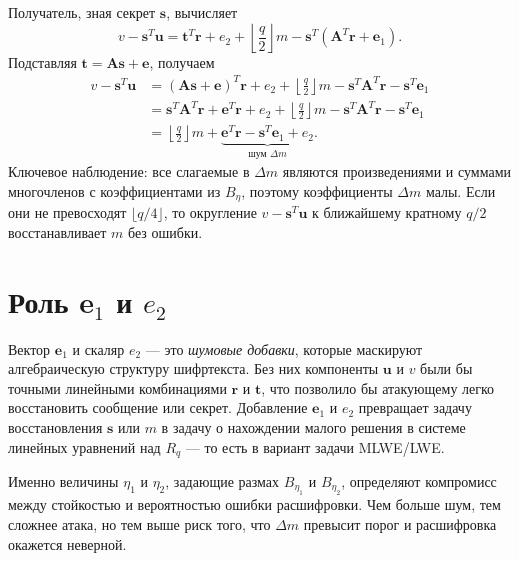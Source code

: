 \documentclass[11pt,a4paper]{article}
\begin{document}
Получатель, зная секрет \(\mathbf{s}\), вычисляет
\[
    v - \mathbf{s}^T \mathbf{u}
    = \mathbf{t}^T \mathbf{r} + e_2 + \left\lfloor \frac{q}{2} \right\rfloor m - \mathbf{s}^T (\mathbf{A}^T \mathbf{r} + \mathbf{e}_1).
\]
Подставляя \(\mathbf{t} = \mathbf{A}\mathbf{s} + \mathbf{e}\), получаем
\begin{align*}
    v - \mathbf{s}^T \mathbf{u}
     & = (\mathbf{A}\mathbf{s} + \mathbf{e})^T \mathbf{r} + e_2 + \left\lfloor \frac{q}{2} \right\rfloor m
    - \mathbf{s}^T \mathbf{A}^T \mathbf{r} - \mathbf{s}^T \mathbf{e}_1                                                                             \\
     & = \mathbf{s}^T \mathbf{A}^T \mathbf{r} + \mathbf{e}^T \mathbf{r} + e_2 + \left\lfloor \frac{q}{2} \right\rfloor m
    - \mathbf{s}^T \mathbf{A}^T \mathbf{r} - \mathbf{s}^T \mathbf{e}_1                                                                             \\
     & = \left\lfloor \frac{q}{2} \right\rfloor m + \underbrace{\mathbf{e}^T \mathbf{r} - \mathbf{s}^T \mathbf{e}_1 + e_2}_{\text{шум } \Delta m}.
\end{align*}
Ключевое наблюдение: все слагаемые в \(\Delta m\) являются произведениями и суммами многочленов с коэффициентами из \(B_\eta\), поэтому коэффициенты \(\Delta m\) малы. Если они не превосходят \(\lfloor q/4 \rfloor\), то округление \(v - \mathbf{s}^T \mathbf{u}\) к ближайшему кратному \(q/2\) восстанавливает \(m\) без ошибки.

\newpage
\section{Роль \(\mathbf{e}_1\) и \(e_2\)}

Вектор \(\mathbf{e}_1\) и скаляр \(e_2\) — это \emph{шумовые добавки}, которые маскируют алгебраическую структуру шифртекста. Без них компоненты \(\mathbf{u}\) и \(v\) были бы точными линейными комбинациями \(\mathbf{r}\) и \(\mathbf{t}\), что позволило бы атакующему легко восстановить сообщение или секрет. Добавление \(\mathbf{e}_1\) и \(e_2\) превращает задачу восстановления \(\mathbf{s}\) или \(m\) в задачу о нахождении малого решения в системе линейных уравнений над \(R_q\) — то есть в вариант задачи MLWE/LWE.

Именно величины \(\eta_1\) и \(\eta_2\), задающие размах \(B_{\eta_1}\) и \(B_{\eta_2}\), определяют компромисс между стойкостью и вероятностью ошибки расшифровки. Чем больше шум, тем сложнее атака, но тем выше риск того, что \(\Delta m\) превысит порог и расшифровка окажется неверной.
\end{document}
